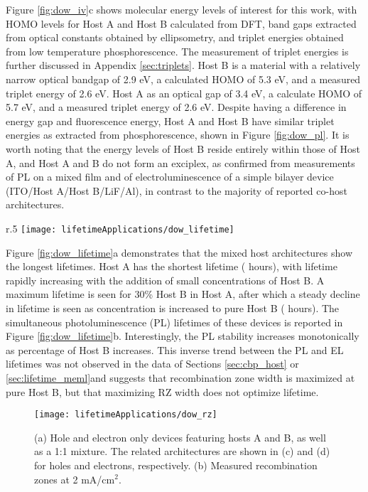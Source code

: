 \documentclass[../thesis.tex]{subfiles}
\begin{document}
Figure \ref{fig:dow_iv}c shows molecular energy levels of interest for this work, with HOMO levels for Host A and Host B calculated from DFT, band gaps extracted from optical constants obtained by ellipsometry, and triplet energies obtained from low temperature phosphorescence.  
The measurement of triplet energies is further discussed in Appendix \ref{sec:triplets}.
Host B is a material with a relatively narrow optical bandgap of 2.9 eV, a calculated HOMO of 5.3 eV, and a measured triplet energy of 2.6 eV. 
Host A as an optical gap of 3.4 eV, a calculate HOMO of 5.7 eV, and a measured triplet energy of 2.6 eV. 
Despite having a difference in energy gap and fluorescence energy, Host A and Host B have similar triplet energies as extracted from phosphorescence, shown in Figure \ref{fig:dow_pl}.
It is worth noting that the energy levels of Host B reside entirely within those of Host A, and Host A and B do not form an exciplex, as confirmed from measurements of PL on a mixed film and of electroluminescence of a simple bilayer device (ITO/Host A/Host B/LiF/Al), in contrast to the majority of reported co-host architectures. 

\begin{wrapfigure}{r}{.5\textwidth}
\centering
\texttt{[image: lifetimeApplications/dow\_lifetime]}
\caption{Total lifetime (a) and \pl lifetime for selected architectures.}
\label{fig:dow_lifetime}
\end{wrapfigure}

Figure \ref{fig:dow_lifetime}a demonstrates that the mixed host architectures show the longest lifetimes. 
Host A has the shortest lifetime ( hours), with lifetime rapidly increasing with the addition of small concentrations of Host B. 
A maximum lifetime is seen for 30\% Host B in Host A, after which a steady decline in lifetime is seen as concentration is increased to pure Host B ( hours). 
The simultaneous photoluminescence (PL) lifetimes of these devices is reported in Figure \ref{fig:dow_lifetime}b. 
Interestingly, the PL stability increases monotonically as percentage of Host B increases. 
This inverse trend between the PL and EL lifetimes was not observed in the data of Sections \ref{sec:cbp_host} or \ref{sec:lifetime_meml}and suggests that recombination zone width is maximized at pure Host B, but that maximizing RZ width does not optimize lifetime.


\begin{figure}[ht]
\centering
\texttt{[image: lifetimeApplications/dow\_rz]}
\caption{(a) Hole and electron only devices featuring hosts A and B, as well as a 1:1 mixture.  The related architectures are shown in (c) and (d) for holes and electrons, respectively.  (b) Measured recombination zones at 2 mA/cm$^2$.}
\label{fig:dow_rz}
\end{figure}
\end{document}
